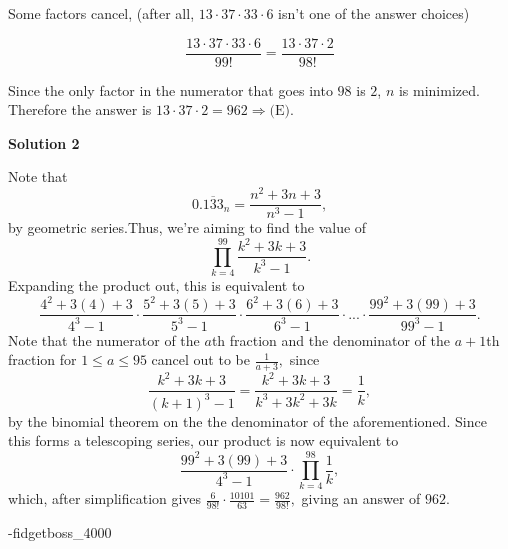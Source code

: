 \begin{enumerate}
 Some factors cancel, (after all, $13 \cdot 37 \cdot 33 \cdot 6$ isn't one of the answer choices)

 
 \[\frac{13 \cdot 37 \cdot 33 \cdot 6}{99!}=\frac{13 \cdot 37 \cdot 2}{98!}\]

 Since the only factor in the numerator that goes into $98$ is $2$, $n$ is minimized. Therefore the answer is $13 \cdot 37 \cdot 2=962 \Rightarrow \text {(E)}$.

 



\textbf{Solution 2}

Note that
 \[0.\overline{133}_n = \frac{n^2+3n+3}{n^3-1},\]by geometric series.Thus, we're aiming to find the value of
 \[\prod_{k=4}^{99} \frac{k^2+3k+3}{k^3 - 1}.\]Expanding the product out, this is equivalent to
 \[\frac{4^2+3(4)+3}{4^3 - 1} \cdot \frac{5^2+3(5)+3}{5^3 - 1} \cdot \frac{6^2+3(6)+3}{6^3 - 1} \cdot ... \cdot \frac{99^2+3(99)+3}{99^3 - 1}.\]Note that the numerator of the $a$th fraction and the denominator of the $a+1$th fraction for $1 \leq a \leq 95$ cancel out to be $\frac{1}{a+3},$ since
 \[\frac{k^2 + 3k + 3}{(k+1)^3 - 1} = \frac{k^2 + 3k + 3}{k^3 + 3k^2 + 3k} = \frac{1}{k},\]by the binomial theorem on the the denominator of the aforementioned. Since this forms a telescoping series, our product is now equivalent to
 \[\frac{99^2 + 3(99) + 3}{4^3 - 1} \cdot \prod_{k=4}^{98} \frac{1}{k},\]which, after simplification gives $\frac{6}{98!} \cdot \frac{10101}{63} = \frac{962}{98!},$ giving an answer of $\boxed{962}.$

 -fidgetboss\_4000

 


\end{enumerate}